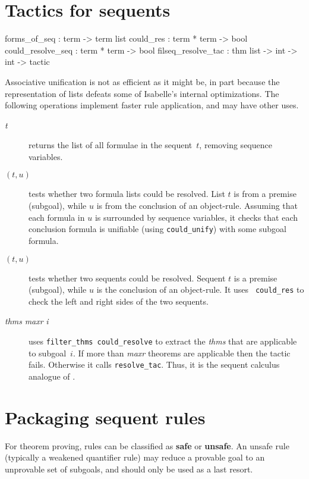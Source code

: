 \section{Tactics for sequents}
\begin{ttbox} 
forms_of_seq       : term -> term list
could_res          : term * term -> bool
could_resolve_seq  : term * term -> bool
filseq_resolve_tac : thm list -> int -> int -> tactic
\end{ttbox}
Associative unification is not as efficient as it might be, in part because
the representation of lists defeats some of Isabelle's internal
optimizations.  The following operations implement faster rule application,
and may have other uses.
\begin{description}
\item[ {\it t}] 
returns the list of all formulae in the sequent~$t$, removing sequence
variables.

\item[ $(t,u)$] 
tests whether two formula lists could be resolved.  List $t$ is from a
premise (subgoal), while $u$ is from the conclusion of an object-rule.
Assuming that each formula in $u$ is surrounded by sequence variables, it
checks that each conclusion formula is unifiable (using {\tt could_unify})
with some subgoal formula.

\item[ $(t,u)$] 
tests whether two sequents could be resolved.  Sequent $t$ is a premise
(subgoal), while $u$ is the conclusion of an object-rule.  It uses {\tt
could_res} to check the left and right sides of the two sequents.

\item[ {\it thms} {\it maxr} {\it i}] 
uses {\tt filter_thms could_resolve} to extract the {\it thms} that are
applicable to subgoal~$i$.  If more than {\it maxr\/} theorems are
applicable then the tactic fails.  Otherwise it calls {\tt resolve_tac}.
Thus, it is the sequent calculus analogue of .
\end{description}



\section{Packaging sequent rules}
For theorem proving, rules can be classified as {\bf safe} or {\bf
unsafe}.  An unsafe rule (typically a weakened quantifier rule) may reduce
a provable goal to an unprovable set of subgoals, and should only be used
as a last resort.  

